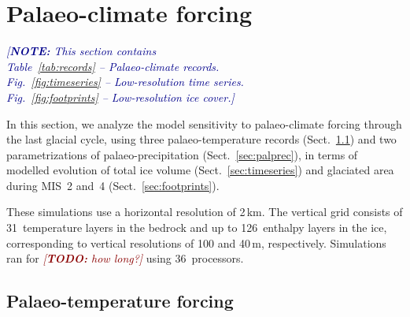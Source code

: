 \documentclass[tc, manuscript]{copernicus}
\newcommand{\note}[1]{\textcolor{darkblue}{\emph{[\textbf{NOTE:} #1]}}}
\newcommand{\todo}[1]{\textcolor{darkred}{\emph{[\textbf{TODO:} #1]}}}
\begin{document}
\section{Palaeo-climate forcing}
\label{sec:climate}

    \note{This section contains\\
      Table~\ref{tab:records} -- Palaeo-climate records.\\
      Fig.~\ref{fig:timeseries} -- Low-resolution time series.\\
      Fig.~\ref{fig:footprints} -- Low-resolution ice cover.}

    In this section, we analyze the model sensitivity to palaeo-climate forcing
    through the last glacial cycle, using three palaeo-temperature records
    (Sect.~\ref{sec:paltemp}) and two parametrizations of palaeo-precipitation
    (Sect.~\ref{sec:palprec}), in terms of modelled evolution of total ice
    volume (Sect.~\ref{sec:timeseries}) and glaciated area during MIS~2 and~4
    (Sect.~\ref{sec:footprints}).

    These simulations use a horizontal resolution of 2\,km. The vertical grid
    consists of 31~temperature layers in the bedrock and up to 126~enthalpy
    layers in the ice, corresponding to vertical resolutions of 100 and
    40\,\unit{m}, respectively. Simulations ran for \todo{how long?}
    using 36~processors.


\subsection{Palaeo-temperature forcing}
\label{sec:paltemp}
\end{document}
